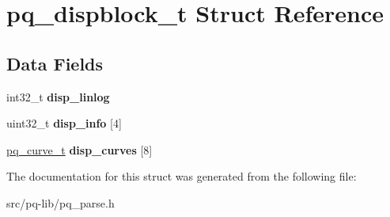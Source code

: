 \hypertarget{structpq__dispblock__t}{}\section{pq\+\_\+dispblock\+\_\+t Struct Reference}
\label{structpq__dispblock__t}
\subsection*{Data Fields}
\begin{DoxyCompactItemize}
\item 
\hypertarget{structpq__dispblock__t_a0c63c468abaad09f02f5901f52bed2f7}{}int32\+\_\+t {\bfseries disp\+\_\+linlog}\label{structpq__dispblock__t_a0c63c468abaad09f02f5901f52bed2f7}

\item 
\hypertarget{structpq__dispblock__t_ac6752403b2f8d9f20759f4dddbbabe35}{}uint32\+\_\+t {\bfseries disp\+\_\+info} \mbox{[}4\mbox{]}\label{structpq__dispblock__t_ac6752403b2f8d9f20759f4dddbbabe35}

\item 
\hypertarget{structpq__dispblock__t_a3ffcac9d433584b9b6920417b4cbd5d1}{}\hyperlink{structpq__curve__t}{pq\+\_\+curve\+\_\+t} {\bfseries disp\+\_\+curves} \mbox{[}8\mbox{]}\label{structpq__dispblock__t_a3ffcac9d433584b9b6920417b4cbd5d1}

\end{DoxyCompactItemize}


The documentation for this struct was generated from the following file\+:\begin{DoxyCompactItemize}
\item 
src/pq-\/lib/pq\+\_\+parse.\+h\end{DoxyCompactItemize}
